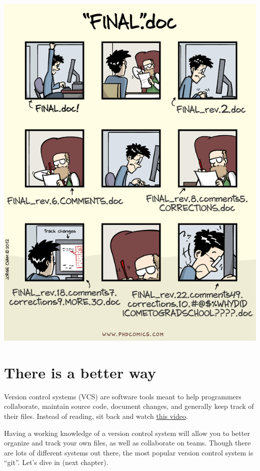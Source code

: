 \documentclass[
]{book}
\begin{document}
\includegraphics{img/version_control_2.png}

\hypertarget{there-is-a-better-way}{%
\section*{There is a better way}\label{there-is-a-better-way}}

Version control systems (VCS) are software tools meant to help programmers collaborate, maintain source code, document changes, and generally keep track of their files. Instead of reading, sit back and watch \href{https://youtu.be/9GKpbI1siow}{this video}.

Having a working knowledge of a version control system will allow you to better organize and track your own files, as well as collaborate on teams. Though there are lots of different systems out there, the most popular version control system is ``git''. Let's dive in (next chapter).
\end{document}

